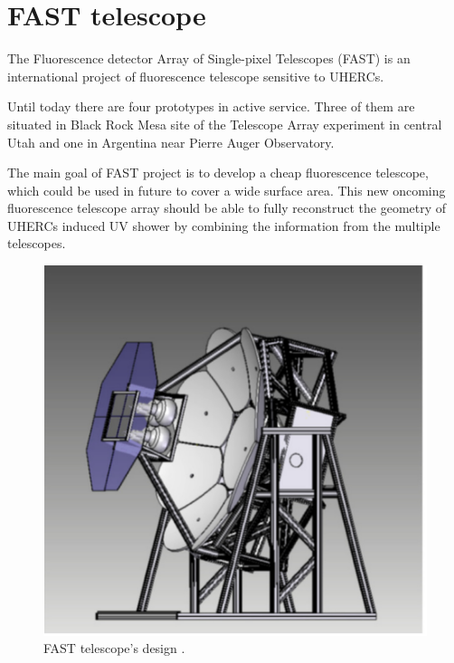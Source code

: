 
\chapter{FAST telescope}
The  Fluorescence  detector  Array  of  Single-pixel  Telescopes  (FAST) is an international project of fluorescence telescope sensitive to UHERCs. 
\par
Until today there are four prototypes in active service. Three of them are situated in Black Rock Mesa site of the Telescope Array experiment in central Utah and one in Argentina near Pierre Auger Observatory.
\par
The main goal of FAST project is to develop a cheap fluorescence telescope, which could be used in future to cover a wide surface area. This new oncoming fluorescence telescope array should be able  
to fully reconstruct the geometry of UHERCs induced UV shower by combining the information from the multiple telescopes.

\begin{figure}[H]
 \centering
 \includegraphics[scale = 0.5]{./pictures/fastTheoretical}
 \caption{FAST telescope's design \cite{MALACARI2020102430}.}
 \label{FASThut}
 
\end{figure}


